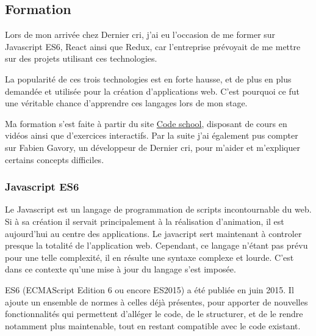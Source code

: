\documentclass[12pt,a4paper]{article}
\begin{document}
  \subsection{Formation}\label{formation}

  \bigskip

  Lors de mon arrivée chez Dernier cri, j'ai eu l'occasion de me former
  sur Javascript ES6, React ainsi que Redux, car l'entreprise prévoyait de
  me mettre sur des projets utilisant ces technologies.

  \bigskip

  La popularité de ces trois technologies est en forte hausse, et de plus
  en plus demandée et utilisée pour la création d'applications web. C'est
  pourquoi ce fut une véritable chance d'apprendre ces langages lors de
  mon stage.

  \bigskip

  Ma formation s'est faite à partir du site
  \href{https://www.codeschool.com/}{Code school}, disposant de cours en
  vidéos ainsi que d'exercices interactifs. Par la suite j'ai également
  pus compter sur Fabien Gavory, un développeur de Dernier cri, pour
  m'aider et m'expliquer certains concepts difficiles.

  \bigskip

  \subsubsection{Javascript ES6}\label{javascript-es6}

  \bigskip

  Le Javascript est un langage de programmation de scripts incontournable
  du web. Si à sa création il servait principalement à la réalisation
  d'animation, il est aujourd'hui au centre des applications. Le javacript
  sert maintenant à controler presque la totalité de l'application web.
  Cependant, ce langage n'étant pas prévu pour une telle complexité, il en
  résulte une syntaxe complexe et lourde. C'est dans ce contexte qu'une
  mise à jour du langage s'est imposée.

  \bigskip

  ES6 (ECMAScript Edition 6 ou encore ES2015) a été publiée en juin 2015.
  Il ajoute un ensemble de normes à celles déjà présentes, pour apporter
  de nouvelles fonctionnalités qui permettent d'alléger le code, de le
  structurer, et de le rendre notamment plus maintenable, tout en restant
  compatible avec le code existant.

  \bigskip
\end{document}
